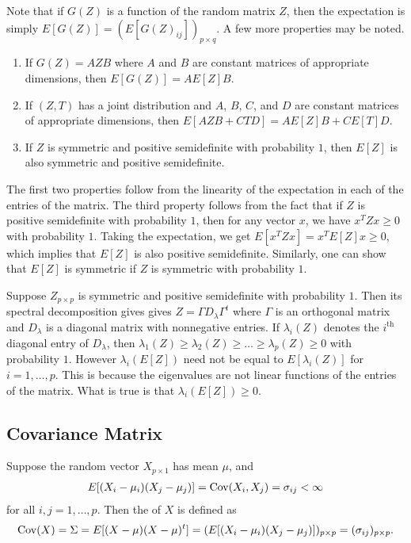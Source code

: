Note that if $G(Z)$ is a function of the random matrix $Z$, then the expectation is simply $E[G(Z)] = (E[G(Z)_{ij}])_{p \times q}$. A few more properties may be noted.

\begin{enumerate}
    \item If $G(Z) = AZB$ where $A$ and $B$ are constant matrices of appropriate dimensions, then $E[G(Z)] = A E[Z] B$.
    \item If $(Z,T)$ has a joint distribution and $A$, $B$, $C$, and $D$ are constant matrices of appropriate dimensions, then $E[AZB + CTD] = A E[Z] B + C E[T] D$.
    \item If $Z$ is symmetric and positive semidefinite with probability $1$, then $E[Z]$ is also symmetric and positive semidefinite.
\end{enumerate}
The first two properties follow from the linearity of the expectation in each of the entries of the matrix. The third property follows from the fact that if $Z$ is positive semidefinite with probability $1$, then for any vector $x$, we have $x^T Z x \geq 0$ with probability $1$. Taking the expectation, we get $E[x^T Z x] = x^T E[Z] x \geq 0$, which implies that $E[Z]$ is also positive semidefinite. Similarly, one can show that $E[Z]$ is symmetric if $Z$ is symmetric with probability $1$.

\begin{example}
    Suppose $Z_{p \times p}$ is symmetric and positive semidefinite with probability $1$. Then its spectral decomposition gives gives $Z = \Gamma D_{\lambda} \Gamma^{t}$ where $\Gamma$ is an orthogonal matrix and $D_{\lambda}$ is a diagonal matrix with nonnegative entries. If $\lambda_{i}(Z)$ denotes the $i^{\text{th}}$ diagonal entry of $D_{\lambda}$, then $\lambda_{1}(Z) \geq \lambda_{2}(Z) \geq \ldots \geq \lambda_{p}(Z) \geq 0$ with probability $1$. However $\lambda_{i}(E[Z])$ need not be equal to $E[\lambda_{i}(Z)]$ for $i = 1, \ldots, p$. This is because the eigenvalues are not linear functions of the entries of the matrix. What is true is that $\lambda_{i}(E[Z]) \geq 0$.
\end{example}

\subsection{Covariance Matrix}

\begin{definition}
    Suppose the random vector $X_{p \times 1}$ has mean $\mu$, and
    \begin{align}
        E[(X_{i}-\mu_{i})(X_{j}-\mu_{j})] = \operatorname{Cov}(X_{i},X_{j}) = \sigma_{ij} < \infty
    \end{align}
    for all $i,j = 1,\ldots,p$. Then the  of $X$ is defined as
    \begin{align}
        \operatorname{Cov}(X) = \Sigma = E[(X-\mu)(X-\mu)^{t}] = (E[(X_{i}-\mu_{i})(X_{j}-\mu_{j})])_{p \times p} = (\sigma_{ij})_{p \times p}.
    \end{align}
\end{definition}

